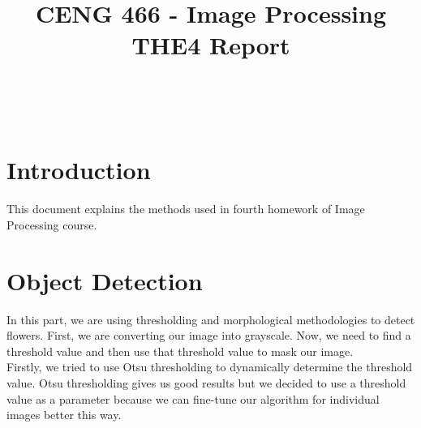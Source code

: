 \documentclass[conference]{IEEEtran}
\begin{document}
\title{CENG 466 - Image Processing THE4 Report} \\
\author{
\and
{}
}

\maketitle

\section{Introduction}
This document explains the methods used in fourth homework of Image Processing course.

\section{Object Detection}

In this part, we are using thresholding and morphological methodologies to detect flowers. First, we are converting our image into grayscale. Now, we need to find a threshold value and then use that threshold value to mask our image. \\

Firstly, we tried to use Otsu thresholding to dynamically determine the threshold value. Otsu thresholding gives us good results but we decided to use a threshold value as a parameter because we can fine-tune our algorithm for individual images better this way.
\end{document}
